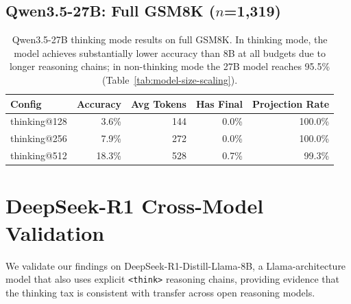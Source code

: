 \subsection{Qwen3.5-27B: Full GSM8K ($n$=1,319)}

\begin{table}[ht]
\centering
\small
\caption{Qwen3.5-27B thinking mode results on full GSM8K.
In thinking mode, the model achieves substantially lower accuracy than
8B at all budgets due to longer reasoning chains; in non-thinking mode
the 27B model reaches 95.5\% (Table~\ref{tab:model-size-scaling}).}
\label{tab:27b-full}
\begin{tabular}{lrrrr}
\toprule
\textbf{Config} & \textbf{Accuracy} & \textbf{Avg Tokens} & \textbf{Has Final} & \textbf{Projection Rate} \\
\midrule
thinking@128 & 3.6\% & 144 & 0.0\% & 100.0\% \\
thinking@256 & 7.9\% & 272 & 0.0\% & 100.0\% \\
thinking@512 & 18.3\% & 528 & 0.7\% & 99.3\% \\
\bottomrule
\end{tabular}
\end{table}

\section{DeepSeek-R1 Cross-Model Validation}
\label{app:deepseek}

We validate our findings on DeepSeek-R1-Distill-Llama-8B, a Llama-architecture model
that also uses explicit \texttt{<think>} reasoning chains, providing evidence that the thinking tax
is consistent with transfer across open reasoning models.

